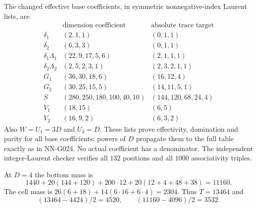 The changed effective base coefficients, in symmetric
nonnegative-index Laurent lists, are
\[
\begin{array}{c|l|l}
 &\text{dimension coefficient}&\text{absolute trace target}\\\hline
 \delta_1&(2,1,1)&(0,1,1)\\
 \delta_2&(6,3,3)&(0,1,1)\\
 \delta_1\Lambda_1&(22,9,17,5,6)&(2,1,1,1)\\
 \delta_2\Lambda_2&(2,5,2,3,1)&(2,3,2,1,1)\\
 G_1&(36,30,18,6)&(16,12,4)\\
 G_2&(30,25,15,5)&(14,11,5,1)\\
 S&(280,250,180,100,40,10)&(144,120,68,24,4)\\
 V_1&(18,15)&(6,5)\\
 V_2&(16,9,2)&(6,3,2)
\end{array}                                                        \tag{G025.2}
\]
Also $W=U_1=3D$ and $U_2=D$. These lists prove effectivity,
domination and parity for all base coefficients; powers
of $D$ propagate them to the full table exactly as in
NN-G024. No actual coefficient has a denominator.
The independent integer-Laurent checker verifies all
$132$ positions and all $1000$ associativity triples.

At $D=4$ the bottom mass is
\[
 1440+20(144+120)+200\cdot12+20(12+4+48+38)=11160.
\]
The cell mass is
$26(6+18)+14(6\cdot16+6\cdot4)=2304$.
Thus $T=13464$ and
\[
 (13464-4424)/2=4520,\qquad(11160-4096)/2=3532.
 \tag{G025.3}
\]

